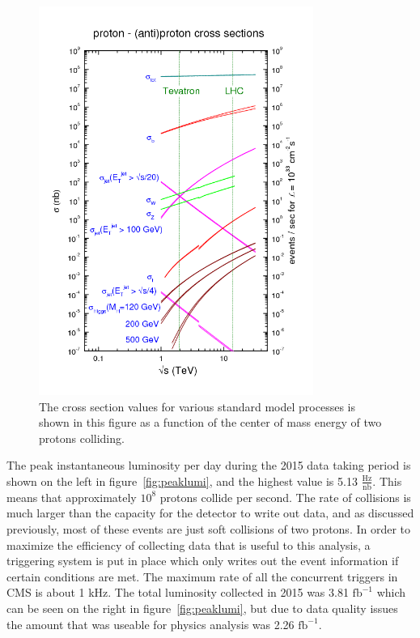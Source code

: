\begin{figure}[!ht]
  \begin{center}
    \includegraphics[width=0.8\textwidth]{cms/figs/cross-sections.png}
    \caption{
      The cross section values for various standard model processes is shown in this figure as a
      function of the center of mass energy of two protons colliding.
      \label{fig:xsecs}
    }
  \end{center}
\end{figure}

The peak instantaneous luminosity per day during the 2015 data taking period is shown on the left in figure~\ref{fig:peaklumi},
and the highest value is 5.13 $\mathrm{\frac{Hz}{nb}}$.
This means that approximately $\mathrm{10^{8}}$ protons collide per second.
The rate of collisions is much larger than the capacity for the detector to write out data,
and as discussed previously, most of these events are just soft collisions of two protons.
In order to maximize the efficiency of collecting data that is useful to this analysis,
a triggering system is put in place which only writes out the event information if certain conditions are met.
The maximum rate of all the concurrent triggers in CMS is about 1 kHz.
The total luminosity collected in 2015 was 3.81 $\mathrm{fb^{-1}}$ which can be seen on the right in figure~\ref{fig:peaklumi},
but due to data quality issues the amount that was useable for physics analysis was 2.26 $\mathrm{fb^{-1}}$.

